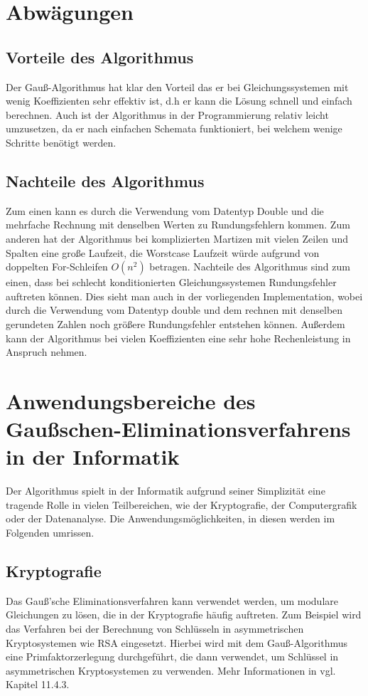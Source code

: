 \documentclass[a4paper, 12pt]{report}
\begin{document}
{\let\clearpage\relax \chapter{Abwägungen}}

\section{Vorteile des Algorithmus}
Der Gauß-Algorithmus hat klar den Vorteil das er bei Gleichungssystemen mit wenig Koeffizienten
sehr effektiv ist, d.h er kann die Lösung schnell und einfach berechnen.
Auch ist der Algorithmus in der Programmierung relativ leicht umzusetzen,
da er nach einfachen Schemata funktioniert, bei welchem wenige Schritte benötigt werden.
\section{Nachteile des Algorithmus}
Zum einen kann es durch die Verwendung vom Datentyp Double und die mehrfache Rechnung mit denselben Werten zu Rundungsfehlern kommen.
Zum anderen hat der Algorithmus bei komplizierten Martizen mit vielen Zeilen und Spalten eine große Laufzeit,
die Worstcase Laufzeit würde aufgrund von doppelten For-Schleifen $ O(n^2) $ betragen.
Nachteile des Algorithmus sind zum einen, dass bei schlecht konditionierten Gleichungssystemen Rundungsfehler auftreten können.
Dies sieht man auch in der vorliegenden Implementation, wobei durch die Verwendung vom Datentyp double
und dem rechnen mit denselben gerundeten Zahlen noch größere Rundungsfehler entstehen können.
Außerdem kann der Algorithmus bei vielen Koeffizienten eine
sehr hohe Rechenleistung in Anspruch nehmen.
\chapter{Anwendungsbereiche des Gaußschen-Eliminationsverfahrens in der Informatik}
Der Algorithmus spielt in der Informatik aufgrund seiner Simplizität eine tragende Rolle in vielen Teilbereichen,
wie der Kryptografie, der Computergrafik oder der Datenanalyse.
Die Anwendungsmöglichkeiten, in diesen werden im Folgenden umrissen.
\section{Kryptografie}
Das Gauß'sche Eliminationsverfahren kann verwendet werden, um modulare Gleichungen zu lösen,
die in der Kryptografie häufig auftreten.
Zum Beispiel wird das Verfahren bei der Berechnung von Schlüsseln in asymmetrischen Kryptosystemen wie RSA eingesetzt.
Hierbei wird mit dem Gauß-Algorithmus eine Primfaktorzerlegung durchgeführt, die dann
verwendet, um Schlüssel in asymmetrischen Kryptosystemen zu verwenden. Mehr Informationen in \cite{3} vgl. Kapitel 11.4.3.
\end{document}
